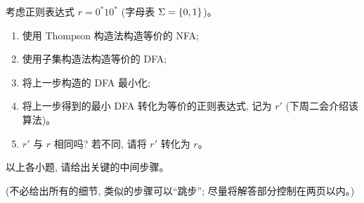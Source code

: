 \documentclass[a4paper, justified]{tufte-handout}
\begin{document}
\begin{problem}[正则表达式与自动机 \score{10 = 2 + 2 + 2 + 2 + 2}]
  考虑正则表达式 $r = 0^{\ast}10^{\ast}$ (字母表 $\Sigma = \{0, 1\}$)。
  \begin{enumerate}[(1)]
    \item 使用 Thompson 构造法构造等价的 NFA;
    \item 使用子集构造法构造等价的 DFA;
    \item 将上一步构造的 DFA 最小化;
    \item 将上一步得到的最小 DFA 转化为等价的正则表达式, 记为 $r'$ (下周二会介绍该算法)。
    \item $r'$ 与 $r$ 相同吗? 若不同, 请将 $r'$ 转化为 $r$。
  \end{enumerate}
  以上各小题, 请给出关键的中间步骤。

  \noindent (不必给出所有的细节, 类似的步骤可以``跳步''; 尽量将解答部分控制在两页以内。)

\end{problem}
\end{document}
